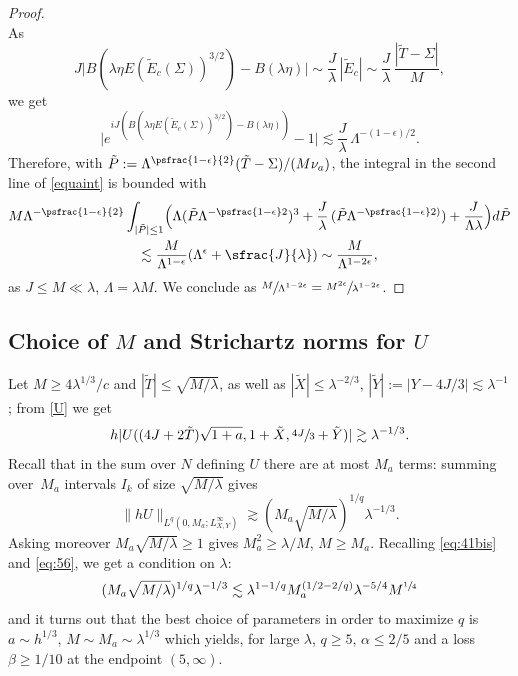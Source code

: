 \begin{proof}
\[\]
As
\[
J\bigl|B(\lambda\eta E(\tilde E_c(\Sigma))^{3/2})-B(\lambda\eta)\bigr|\sim \frac{J}{\lambda}\,|\tilde E_c|\sim\frac{J}{\lambda}\,\frac{|\tilde T-\Sigma|}{M},
\]
we get
\[
\bigl|e^{iJ(B(\lambda\eta E(\tilde E_c(\Sigma))^{3/2})-B(\lambda\eta))}-1\bigl|\lesssim \frac{J}{\lambda}\,\Lambda^{-(1-\epsilon)/2}.
\]
Therefore, with $\tilde P:=\Lambda^{\psfrac{1-\epsilon}{2}}(\tilde T-\Sigma)/(M\nu_a)$, the integral in the second line of \eqref{equaint} is bounded with
\begin{multline*}
M\Lambda^{-\psfrac{1-\epsilon}{2}}\int_{|\tilde P|\leq 1}\Bigl(\Lambda (\tilde P \Lambda^{-\psfrac{1-\epsilon}2})^3+\frac{J}{\lambda}\,(\tilde P\Lambda^{-\psfrac {1-\epsilon}2)})+\frac{J}{\Lambda\lambda}\Bigr)d\tilde P\\
\lesssim \frac{M}{\Lambda^{1-\epsilon}}(\Lambda^{\epsilon}+\sfrac{J}{\lambda})\sim \frac{M}{\Lambda^{1-2\epsilon}},
\end{multline*}
as $J\leq M\ll \lambda$, $\Lambda=\lambda M$. We conclude as $ \sfrac{M}{\Lambda^{1-2\epsilon}}=\sfrac{M^{2\epsilon}}{\lambda^{1-2\epsilon}}$.
\end{proof}

\subsection{Choice of $M$ and Strichartz norms for $U$}

Let $M\geq 4\lambda^{1/3}/c$ and $|\tilde T|\leq \sqrt{M/\lambda}$, as well as $|\tilde X|\leq \lambda^{-2/3}$, $|\tilde Y|:=|Y-4J/3|\lesssim \lambda^{-1}$; from \eqref{U} we get
\begin{equation*}
\label{eq:75}
h |U((4J+2\tilde T)\sqrt{1+a},1+\tilde X,\sfrac{4J}{3}+ \tilde Y)|\gtrsim \lambda^{-1/3} .
\end{equation*}
Recall that in the sum over $N$ defining $U$ there are at most $M_a$ terms: summing over~$M_a$ intervals $I_{k}$ of size $\sqrt{M/\lambda}$ gives
\begin{equation*}
\label{eq:76}
\|h U\|_{L^{q}(0,M_a; L^{\infty}_{X,Y})} \gtrsim (M_a\sqrt{M/\lambda})^{1/q}\lambda^{-1/3}.
\end{equation*}
Asking moreover $M_a\sqrt{M/\lambda}\geq 1$ gives $M_a^2\geq \lambda/M$, $M\geq M_a$.
Recalling \eqref{eq:41bis} and \eqref{eq:56}, we get a condition on $\lambda$:
\begin{equation*}
\label{eq:77}
(M_a\sqrt{M/\lambda})^{1/q} \lambda^{-1/3}\lesssim \lambda^{1-1/q} M_{a}^{(1/2-2/q)}\lambda^{-5/4} M^{\sfrac 14}
\end{equation*}
and it turns out that the best choice of parameters in order to maximize $q$ is $a\sim h^{1/3}$, $M\sim M_a\sim \lambda^{1/3}$ which yields, for large $\lambda$, $q\geq 5$, \eg $\alpha\leq 2/5$ and a loss $\beta\geq 1/10$ at the endpoint $(5,\infty)$.

